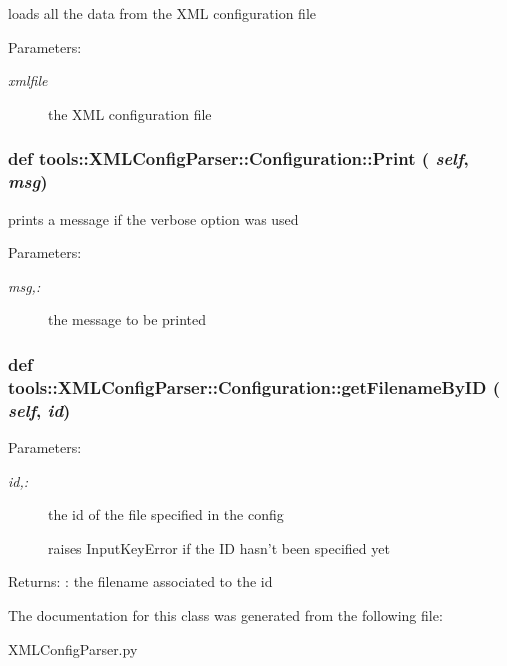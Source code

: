 loads all the data from the XML configuration file 

\begin{Desc}
\item[Parameters:]
\begin{description}
\item[{\em xmlfile}]the XML configuration file \end{description}
\end{Desc}
\hypertarget{classtools_1_1XMLConfigParser_1_1Configuration_44a96475982c563c0cab590fff156072}{
\subsubsection{\setlength{\rightskip}{0pt plus 5cm}def tools::XMLConfigParser::Configuration::Print ( {\em self}, \/   {\em msg})}}
\label{classtools_1_1XMLConfigParser_1_1Configuration_44a96475982c563c0cab590fff156072}


prints a message if the verbose option was used 

\begin{Desc}
\item[Parameters:]
\begin{description}
\item[{\em msg,:}]the message to be printed \end{description}
\end{Desc}
\hypertarget{classtools_1_1XMLConfigParser_1_1Configuration_4af93add61ddf66d1d48e96f50a506cc}{
\subsubsection{\setlength{\rightskip}{0pt plus 5cm}def tools::XMLConfigParser::Configuration::getFilenameByID ( {\em self}, \/   {\em id})}}
\label{classtools_1_1XMLConfigParser_1_1Configuration_4af93add61ddf66d1d48e96f50a506cc}


\begin{Desc}
\item[Parameters:]
\begin{description}
\item[{\em id,:}]the id of the file specified in the config  \par
 raises InputKeyError if the ID hasn't been specified yet \end{description}
\end{Desc}
\begin{Desc}
\item[Returns:]: the filename associated to the id \end{Desc}


The documentation for this class was generated from the following file:\begin{CompactItemize}
\item 
XMLConfigParser.py\end{CompactItemize}
